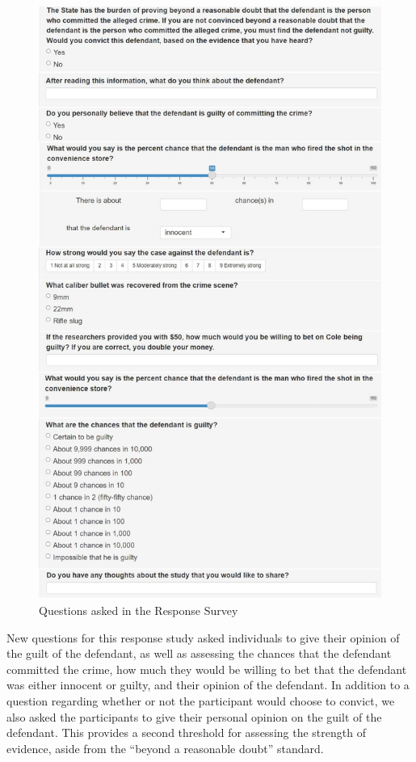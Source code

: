 \documentclass[print]{nuthesis}
\begin{document}
\begin{figure}

{\centering \includegraphics[width=\linewidth]{images/study_questions} 

}

\caption{Questions asked in the Response Survey}\label{fig:questions}
\end{figure}

New questions for this response study asked individuals to give their opinion of the guilt of the defendant, as well as assessing the chances that the defendant committed the crime, how much they would be willing to bet that the defendant was either innocent or guilty, and their opinion of the defendant.
In addition to a question regarding whether or not the participant would choose to convict, we also asked the participants to give their personal opinion on the guilt of the defendant.
This provides a second threshold for assessing the strength of evidence, aside from the ``beyond a reasonable doubt'' standard.
\end{document}
